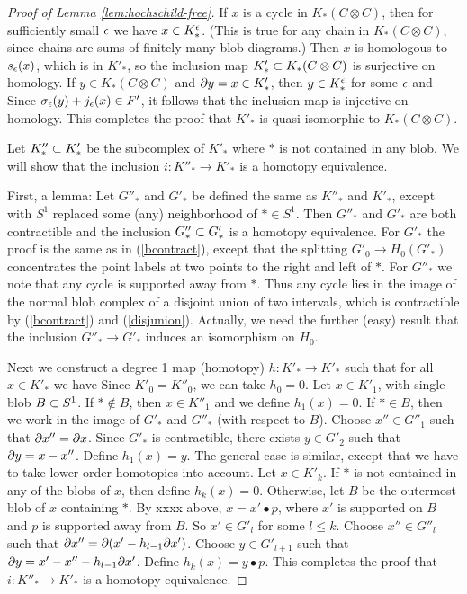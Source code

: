 \begin{proof}[Proof of Lemma \ref{lem:hochschild-free}]
If $x$ is a cycle in $K_*(C\otimes C)$, then for sufficiently small $\epsilon$ we have
$x \in K_*^\epsilon$.
(This is true for any chain in $K_*(C\otimes C)$, since chains are sums of
finitely many blob diagrams.)
Then $x$ is homologous to $s_\epsilon(x)$, which is in $K'_*$, so the inclusion map
$K'_* \subset K_*(C\otimes C)$ is surjective on homology.
If $y \in K_*(C\otimes C)$ and $\partial y = x \in K'_*$, then $y \in K_*^\epsilon$ for some $\epsilon$
and
Since $\sigma_\epsilon(y) + j_\epsilon(x) \in F'$, it follows that the inclusion map is injective on homology.
This completes the proof that $K'_*$ is quasi-isomorphic to $K_*(C\otimes C)$.

Let $K''_* \subset K'_*$ be the subcomplex of $K'_*$ where $*$ is not contained in any blob.
We will show that the inclusion $i: K''_* \to K'_*$ is a homotopy equivalence.

First, a lemma:  Let $G''_*$ and $G'_*$ be defined the same as $K''_*$ and $K'_*$, except with
$S^1$ replaced some (any) neighborhood of $* \in S^1$.
Then $G''_*$ and $G'_*$ are both contractible
and the inclusion $G''_* \subset G'_*$ is a homotopy equivalence.
For $G'_*$ the proof is the same as in (\ref{bcontract}), except that the splitting
$G'_0 \to H_0(G'_*)$ concentrates the point labels at two points to the right and left of $*$.
For $G''_*$ we note that any cycle is supported  away from $*$.
Thus any cycle lies in the image of the normal blob complex of a disjoint union
of two intervals, which is contractible by (\ref{bcontract}) and (\ref{disjunion}).
Actually, we need the further (easy) result that the inclusion
$G''_* \to G'_*$ induces an isomorphism on $H_0$.

Next we construct a degree 1 map (homotopy) $h: K'_* \to K'_*$ such that
for all $x \in K'_*$ we have
Since $K'_0 = K''_0$, we can take $h_0 = 0$.
Let $x \in K'_1$, with single blob $B \subset S^1$.
If $* \notin B$, then $x \in K''_1$ and we define $h_1(x) = 0$.
If $* \in B$, then we work in the image of $G'_*$ and $G''_*$ (with respect to $B$).
Choose $x'' \in G''_1$ such that $\partial x'' = \partial x$.
Since $G'_*$ is contractible, there exists $y \in G'_2$ such that $\partial y = x - x''$.
Define $h_1(x) = y$.
The general case is similar, except that we have to take lower order homotopies into account.
Let $x \in K'_k$.
If $*$ is not contained in any of the blobs of $x$, then define $h_k(x) = 0$.
Otherwise, let $B$ be the outermost blob of $x$ containing $*$.
By xxxx above, $x = x' \bullet p$, where $x'$ is supported on $B$ and $p$ is supported away from $B$.
So $x' \in G'_l$ for some $l \le k$.
Choose $x'' \in G''_l$ such that $\partial x'' = \partial (x' - h_{l-1}\partial x')$.
Choose $y \in G'_{l+1}$ such that $\partial y = x' - x'' - h_{l-1}\partial x'$.
Define $h_k(x) = y \bullet p$.
This completes the proof that $i: K''_* \to K'_*$ is a homotopy equivalence.


\end{proof}

